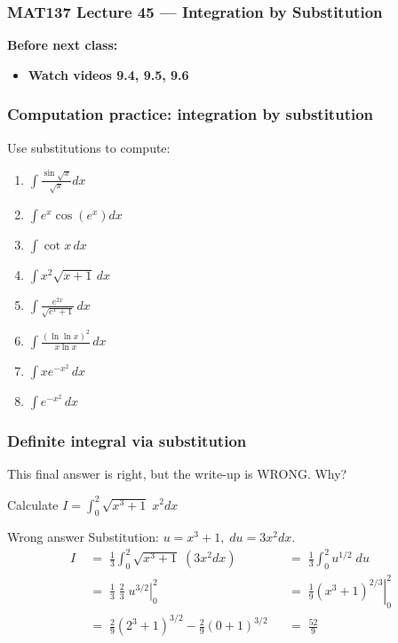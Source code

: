 \documentclass[14pt]{beamer}
\date{}
\title{}
\author{}
\newcommand{\p}{\pause}
\newcommand{\setsize}[1]{\fontsize{#1}{#1}\selectfont} %
\newcommand{\smallerfont}{\setsize{13}} %
\newcommand{\vv}{\vspace{.2cm}}
\begin{document}
\begin{frame}
	\frametitle{MAT137 Lecture 45 --- Integration by Substitution}

	\vfill
	{\bf Before next class:}
		\begin{itemize} \normalsize
			\item {\bf Watch videos 9.4, 9.5, 9.6}
		\end{itemize}
\end{frame}
	\begin{frame}[t]
		\frametitle{Computation practice: integration by substitution}

		Use substitutions to compute:
		\begin{multicols}{2}
			\begin{enumerate}
				\item ${\displaystyle \int \frac{\sin \sqrt{x}}{\sqrt{x}} dx}$ \vv

				\item ${\displaystyle  \int e^x \cos \left(e^x \right) dx }$ \vv

				\item ${\displaystyle  \int \cot x \, dx }$ \vv

				\item ${\displaystyle  \int x^2 \sqrt{x+1} \, dx }$ \vv \p

				\item ${\displaystyle \int \frac{e^{2x}}{\sqrt{e^{x} + 1}} \, dx}$ \vv

				\item ${\displaystyle \int \frac{\left( \ln \ln x \right)^{2}}{ x \ln x} \, dx}$
					\vv

				\item ${\displaystyle \int x e^{-x^2} \, dx}$ \vv

				\item ${\displaystyle \int e^{-x^2} \, dx}$ \vv
			\end{enumerate}
		\end{multicols}
	\end{frame}
	\begin{frame}
		\smallerfont
		\frametitle{Definite integral via substitution}

		This final answer is right, but the write-up is WRONG. Why?
		\vfill

		Calculate ${\displaystyle I = \int_0^2 \sqrt{x^{3}+1} \; x^2 dx}$
		\begin{block}{Wrong answer}
			Substitution: ${\displaystyle u = x^3+1, \; du=3x^2 dx}$.
			\begin{align*}
				I \; & = \; \frac{1}{3}\int_{0}^{2} \sqrt{x^{3}+1}\; (3x^{2} dx)                            &  & = \; \frac{1}{3}\int_{0}^{2} u^{1/2}\; du                            \\
				     & = \; \frac{1}{3}\; \frac{2}{3}\; \left. u^{3/2}\right\vert_{0}^{2}                   &  & = \; \left. \frac{1}{9}\left(x^{3}+1\right)^{2/3}\right\vert_{0}^{2} \\
				     & = \; \frac{2}{9}\left( 2^{3} + 1 \right)^{3/2}- \frac{2}{9}\left( 0 + 1\right)^{3/2} &  & = \; \frac{52}{9}
			\end{align*}
		\end{block}
	\end{frame}
\end{document}
